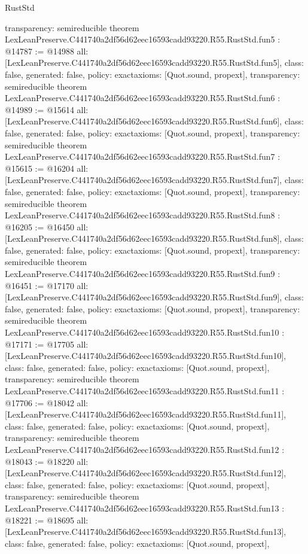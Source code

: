 \begin{lexlean}{RustStd}
\begin{coremodule}
{  transparency: semireducible
}
theorem LexLeanPreserve.C441740a2df56d62eec16593cadd93220.R55.RustStd.fun5 : @14787 := @14988 {
  all: [LexLeanPreserve.C441740a2df56d62eec16593cadd93220.R55.RustStd.fun5],
  class: false,
  generated: false,
  policy: exact{axioms: [Quot.sound, propext]},
  transparency: semireducible
}
theorem LexLeanPreserve.C441740a2df56d62eec16593cadd93220.R55.RustStd.fun6 : @14989 := @15614 {
  all: [LexLeanPreserve.C441740a2df56d62eec16593cadd93220.R55.RustStd.fun6],
  class: false,
  generated: false,
  policy: exact{axioms: [Quot.sound, propext]},
  transparency: semireducible
}
theorem LexLeanPreserve.C441740a2df56d62eec16593cadd93220.R55.RustStd.fun7 : @15615 := @16204 {
  all: [LexLeanPreserve.C441740a2df56d62eec16593cadd93220.R55.RustStd.fun7],
  class: false,
  generated: false,
  policy: exact{axioms: [Quot.sound, propext]},
  transparency: semireducible
}
theorem LexLeanPreserve.C441740a2df56d62eec16593cadd93220.R55.RustStd.fun8 : @16205 := @16450 {
  all: [LexLeanPreserve.C441740a2df56d62eec16593cadd93220.R55.RustStd.fun8],
  class: false,
  generated: false,
  policy: exact{axioms: [Quot.sound, propext]},
  transparency: semireducible
}
theorem LexLeanPreserve.C441740a2df56d62eec16593cadd93220.R55.RustStd.fun9 : @16451 := @17170 {
  all: [LexLeanPreserve.C441740a2df56d62eec16593cadd93220.R55.RustStd.fun9],
  class: false,
  generated: false,
  policy: exact{axioms: [Quot.sound, propext]},
  transparency: semireducible
}
theorem LexLeanPreserve.C441740a2df56d62eec16593cadd93220.R55.RustStd.fun10 : @17171 := @17705 {
  all: [LexLeanPreserve.C441740a2df56d62eec16593cadd93220.R55.RustStd.fun10],
  class: false,
  generated: false,
  policy: exact{axioms: [Quot.sound, propext]},
  transparency: semireducible
}
theorem LexLeanPreserve.C441740a2df56d62eec16593cadd93220.R55.RustStd.fun11 : @17706 := @18042 {
  all: [LexLeanPreserve.C441740a2df56d62eec16593cadd93220.R55.RustStd.fun11],
  class: false,
  generated: false,
  policy: exact{axioms: [Quot.sound, propext]},
  transparency: semireducible
}
theorem LexLeanPreserve.C441740a2df56d62eec16593cadd93220.R55.RustStd.fun12 : @18043 := @18220 {
  all: [LexLeanPreserve.C441740a2df56d62eec16593cadd93220.R55.RustStd.fun12],
  class: false,
  generated: false,
  policy: exact{axioms: [Quot.sound, propext]},
  transparency: semireducible
}
theorem LexLeanPreserve.C441740a2df56d62eec16593cadd93220.R55.RustStd.fun13 : @18221 := @18695 {
  all: [LexLeanPreserve.C441740a2df56d62eec16593cadd93220.R55.RustStd.fun13],
  class: false,
  generated: false,
  policy: exact{axioms: [Quot.sound, propext]},
}
\end{coremodule}
\end{lexlean}
